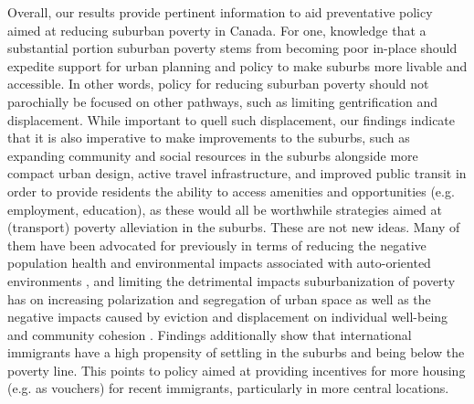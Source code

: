 Overall, our results provide pertinent information to aid preventative policy aimed at reducing suburban poverty in Canada. For one, knowledge that a substantial portion suburban poverty stems from becoming poor in-place should expedite support for urban planning and policy to make suburbs more livable and accessible. In other words, policy for reducing suburban poverty should not parochially be focused on other pathways, such as limiting gentrification and displacement. While important to quell such displacement, our findings indicate that it is also imperative to make improvements to the suburbs, such as expanding community and social resources in the suburbs alongside more compact urban design, active travel infrastructure, and improved public transit in order to provide residents the ability to access amenities and opportunities (e.g. employment, education), as these would all be worthwhile strategies aimed at (transport) poverty alleviation in the suburbs. These are not new ideas. Many of them have been advocated for previously in terms of reducing the negative population health and environmental impacts associated with auto-oriented environments , and limiting the detrimental impacts suburbanization of poverty has on increasing polarization and segregation of urban space as well as the negative impacts caused by eviction and displacement on individual well-being and community cohesion  . Findings additionally show that international immigrants have a high propensity of settling in the suburbs and being below the poverty line. This points to policy aimed at providing incentives for more housing (e.g. as vouchers) for recent immigrants, particularly in more central locations.








